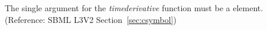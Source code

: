 The single argument for the \emph{timederivative}  function must be a  element.  (Reference: SBML L3V2 Section~\ref{sec:csymbol})

